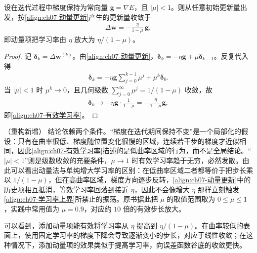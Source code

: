 \documentclass[../../main.tex]{subfiles}
\begin{document}
\begin{proposition}[动量法的有效学习率]\label{proposition:ch07-动量有效学习率}
设在迭代过程中梯度保持为常向量 $\mathbf{g}=\nabla E$，且 $|\mu|<1$。则从任意初始更新量出发，按\eqref{align:ch07-动量更新}产生的更新量收敛于
\begin{align}
\Delta\mathbf{w} = -\frac{\eta}{1-\mu}\,\mathbf{g},
\label{align:ch07-有效学习率}
\end{align}
即动量项把学习率由 $\eta$ 放大为 $\eta/(1-\mu)$。
\end{proposition}
\begin{proof}
记 $\boldsymbol{\delta}_k=\Delta\mathbf{w}^{(k)}$。由\eqref{align:ch07-动量更新}，$\boldsymbol{\delta}_k=-\eta\mathbf{g}+\mu\boldsymbol{\delta}_{k-1}$。反复代入得
\begin{align*}
\boldsymbol{\delta}_k = -\eta\mathbf{g}\sum_{j=0}^{k-1}\mu^{j}+\mu^{k}\boldsymbol{\delta}_0.
\end{align*}
当 $|\mu|<1$ 时 $\mu^{k}\to0$，且几何级数 $\sum_{j=0}^{\infty}\mu^{j}=1/(1-\mu)$ 收敛，故
\begin{align*}
\boldsymbol{\delta}_k \longrightarrow -\eta\mathbf{g}\cdot\frac{1}{1-\mu} = -\frac{\eta}{1-\mu}\mathbf{g},
\end{align*}
即\eqref{align:ch07-有效学习率}。
\end{proof}

\begin{remark}（重构新增）
结论依赖两个条件。“梯度在迭代期间保持不变”是一个局部化的假设：只有在曲率很低、梯度随位置变化很慢的区域，连续若干步的梯度才近似相同，因此\eqref{align:ch07-有效学习率}描述的是低曲率区域的行为，而不是全局结论。“$|\mu|<1$”则是级数收敛的充要条件，$\mu\to1$ 时有效学习率趋于无穷，必然发散。由此可以看出动量法与单纯增大学习率的区别：在低曲率区域二者都等价于把步长乘以 $1/(1-\mu)$，但在高曲率区域，梯度方向逐步反转，\eqref{align:ch07-动量更新}中的历史项相互抵消，等效学习率回落到接近 $\eta$，因此不会像增大 $\eta$ 那样立刻触发\eqref{align:ch07-学习率上界}所禁止的振荡。原书据此把 $\mu$ 的取值范围取为 $0\leqslant\mu\leqslant1$，实践中常用值为 $\mu=0.9$，对应约 $10$ 倍的有效步长放大。
\end{remark}

可以看到，添加动量项能有效将学习率从 $\eta$ 提高到 $\eta/(1-\mu)$。在曲率较低的表面上，使用固定学习率的梯度下降会导致逐渐变小的步长，对应于线性收敛；在这种情况下，添加动量项的效果类似于提高学习率，向误差函数谷底的收敛更快。
\end{document}
